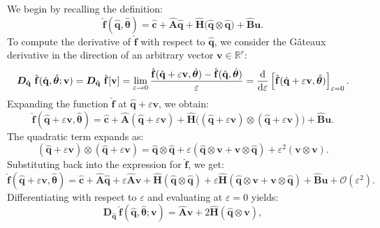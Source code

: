 We begin by recalling the definition:\\
$$
\hat{\mathbf{f}}(\hat{\mathbf{q}}, \hat{\bm{\theta}}) = \hat{\mathbf{c}} + \hat{\mathbf{A}}\hat{\mathbf{q}} + \hat{\mathbf{H}}\bigl( \hat{\mathbf{q}}\otimes \hat{\mathbf{q}} \bigr) + \hat{\mathbf{B}}\mathbf{u}.
$$
To compute the derivative of $\hat{\mathbf{f}}$ with respect to $\hat{\mathbf{q}}$, we consider the Gâteaux derivative in the direction of an arbitrary vector $\mathbf{v}\in \mathbb{R}^r$:\\
$$
\bm{D}_{\hat{\mathbf{q}}}~\hat{\mathbf{f}}(\hat{\mathbf{q}}, \hat{\bm{\theta}}; \mathbf{v}) = \bm{D}_{\hat{\mathbf{q}}}~\hat{\mathbf{f}}[\mathbf{v}] = \lim_{\varepsilon \to 0} \frac{\hat{\mathbf{f}}(\hat{\mathbf{q}} + \varepsilon \mathbf{v}, \hat{\bm{\theta}}) - \hat{\mathbf{f}}(\hat{\mathbf{q}}, \hat{\bm{\theta}})}{\varepsilon} = \dv{}{\varepsilon} \left[ \hat{\mathbf{f}}(\hat{\mathbf{q}} + \varepsilon \mathbf{v}, \hat{\bm{\theta}}) \right]_{\varepsilon = 0}.
$$
Expanding the function $\hat{\mathbf{f}}$ at $\hat{\mathbf{q}} + \varepsilon \mathbf{v}$, we obtain:\\
$$
\hat{\mathbf{f}}(\hat{\mathbf{q}} + \varepsilon \mathbf{v}, \hat{\bm{\theta}}) = \hat{\mathbf{c}} + \hat{\mathbf{A}}(\hat{\mathbf{q}} + \varepsilon \mathbf{v}) + \hat{\mathbf{H}}\bigl( (\hat{\mathbf{q}} + \varepsilon \mathbf{v}) \otimes (\hat{\mathbf{q}} + \varepsilon \mathbf{v}) \bigr) + \hat{\mathbf{B}}\mathbf{u}.
$$
The quadratic term expands as:\\
$$
(\hat{\mathbf{q}} + \varepsilon \mathbf{v}) \otimes (\hat{\mathbf{q}} + \varepsilon \mathbf{v}) = \hat{\mathbf{q}} \otimes \hat{\mathbf{q}} + \varepsilon (\hat{\mathbf{q}} \otimes \mathbf{v} + \mathbf{v} \otimes \hat{\mathbf{q}}) + \varepsilon^2 (\mathbf{v} \otimes \mathbf{v}).
$$
Substituting back into the expression for $\hat{\mathbf{f}}$, we get:\\
$$
\hat{\mathbf{f}}(\hat{\mathbf{q}} + \varepsilon \mathbf{v}, \hat{\bm{\theta}}) = \hat{\mathbf{c}} + \hat{\mathbf{A}}\hat{\mathbf{q}} + \varepsilon \hat{\mathbf{A}}\mathbf{v} + \hat{\mathbf{H}}(\hat{\mathbf{q}} \otimes \hat{\mathbf{q}}) + \varepsilon \hat{\mathbf{H}}(\hat{\mathbf{q}} \otimes \mathbf{v} + \mathbf{v} \otimes \hat{\mathbf{q}}) + \hat{\mathbf{B}}\mathbf{u} + \mathcal{O}(\varepsilon^2).
$$
Differentiating with respect to $\varepsilon$ and evaluating at $\varepsilon = 0$ yields:\\
$$
\bm{D}_{\hat{\mathbf{q}}}~\hat{\mathbf{f}}(\hat{\mathbf{q}},\hat{\bm{\theta}};\mathbf{v}) = \hat{\mathbf{A}}\mathbf{v} + 2\hat{\mathbf{H}}(\hat{\mathbf{q}} \otimes \mathbf{v}),
$$
